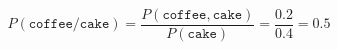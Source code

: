\begin{align*}
  P(\texttt{coffee} / \texttt{cake}) = \dfrac{P(\texttt{coffee}, \texttt{cake})}{P(\texttt{cake})} = \dfrac{0.2}{0.4} = 0.5
\end{align*}
